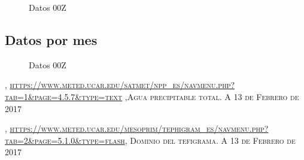\documentclass[12pt]{article}
\begin{document}
 
\begin{figure}[H]
 \centering
    \caption{Datos 00Z}
\end{figure}

\subsection*{Datos por mes}


\begin{figure}[H]
 \centering
    \caption{Datos 00Z}
\end{figure}















\newpage
\renewcommand{\refname}{\section*{Bibliografía}}
\begin{thebibliography}{9}
, \textsc{\url{https://www.meted.ucar.edu/satmet/npp_es/navmenu.php?tab=1&page=4.5.7&type=text} ,Agua precipitable total. A 13 de Febrero de 2017}

, \textsc{\url{https://www.meted.ucar.edu/mesoprim/tephigram_es/navmenu.php?tab=2&page=5.1.0&type=flash}, Dominio del tefigrama. A 13 de Febrero de 2017}


\end{thebibliography}
\end{document}
